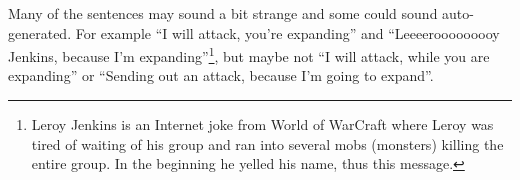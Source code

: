 Many of the sentences may sound a bit strange and some could sound auto-generated. For example ``I will attack, you're expanding'' and ``Leeeerooooooooy Jenkins, because I'm expanding''\footnote{Leroy Jenkins is an Internet joke from World of WarCraft where Leroy was tired of waiting of his group and ran into several mobs (monsters) killing the entire group. In the beginning he yelled his name, thus this message.}, but maybe not ``I will attack, while you are expanding'' or ``Sending out an attack, because I'm going to expand''.